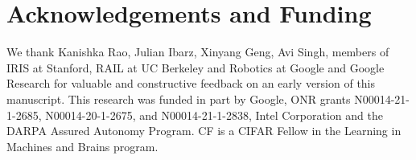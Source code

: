 \documentclass[../thesis.tex]{subfiles}
\begin{document}
    
    
\section*{Acknowledgements and Funding}
We thank Kanishka Rao, Julian Ibarz, Xinyang Geng, Avi Singh, members of IRIS at Stanford, RAIL at UC Berkeley and Robotics at Google and Google Research for valuable and constructive feedback on an early version of this manuscript. This research was funded in part by Google, ONR grants N00014-21-1-2685, N00014-20-1-2675, and N00014-21-1-2838, Intel Corporation and the DARPA Assured Autonomy Program. CF is a CIFAR Fellow in the Learning in Machines and Brains program. 
\end{document}
